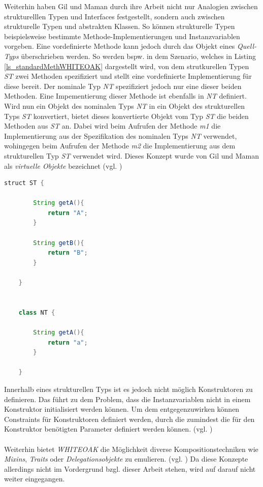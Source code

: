 \documentclass[11pt, 
ngerman,
doublespacing,
chapterinoneline, %
consistentlayout, %
]{scrartcl}
\begin{document}
Weiterhin haben Gil und Maman \cite{whiteoak} durch ihre Arbeit nicht nur Analogien zwischen strukturelllen Typen und Interfaces festgestellt, sondern auch zwischen strukturelle Typen und abstrakten Klassen. So können strukturelle Typen beispielsweise bestimmte Methode-Implementierungen und Instanzvariablen vorgeben. Eine vordefinierte Methode kann jedoch durch das Objekt eines \emph{Quell-Typs} überschrieben werden. So werden bspw. in dem Szenario, welches in Listing \ref{ls_standardMethWHITEOAK} dargestellt wird, von dem strutkurellen Typen \emph{ST} zwei Methoden spezifiziert und stellt eine vordefinierte Implementierung für diese bereit. Der nominale Typ \emph{NT} spezifiziert jedoch nur eine dieser beiden Methoden. Eine Impementierung dieser Methode ist ebenfalls in \emph{NT} definiert. Wird nun ein Objekt des nominalen Typs \emph{NT} in ein Objekt des strukturellen Typs \emph{ST} konvertiert, bietet dieses konvertierte Objekt vom Typ \emph{ST} die beiden Methoden aus \emph{ST} an. Dabei wird beim Aufrufen der Methode \emph{m1} die Implementierung aus der Spezifikation des nominalen Typs \emph{NT} verwendet, wohingegen beim Aufrufen der Methode \emph{m2} die Implementierung aus dem strukturellen Typ \emph{ST} verwendet wird. Dieses Konzept wurde von Gil und Maman als \emph{virtuelle Objekte} bezeichnet (vgl. \cite{whiteoak})
\begin{lstlisting}[caption =Standardmethoden in WHITEOAK, language=Java, label=ls_standardMethWHITEOAK ]
	struct ST {
	
		String getA(){
			return "A";
		}
		
		String getB(){
			return "B";
		}

	}

	
	class NT {

		String getA(){
			return "a";
		}	

	}
\end{lstlisting}
Innerhalb eines strukturellen Typs ist es jedoch nicht möglich Konstruktoren zu definieren. Das führt zu dem Problem, dass die Instanzvariablen nicht in einem Konstruktor initialisiert werden können. Um dem entgegenzuwirken können Constraints für Konstruktoren definiert werden, durch die zumindest die für den Konstruktor benötigten Parameter definiert werden können. (vgl. \cite{whiteoak})\\\\
Weiterhin bietet \emph{WHITEOAK} die Möglichkeit diverse Kompositionstechniken wie \emph{Mixins}, \emph{Traits} oder \emph{Delegationsobjekte} zu emulieren. (vgl. \cite{whiteoak}) Da diese Konzepte allerdings nicht im Vordergrund bzgl. dieser Arbeit stehen, wird auf darauf nicht weiter eingegangen.\\\\
\end{document}
